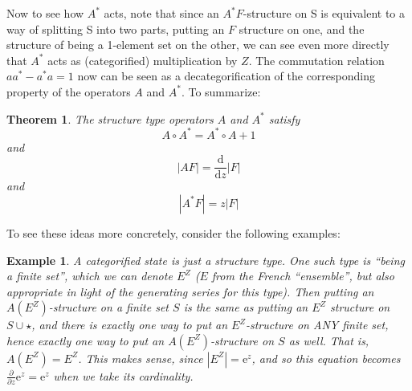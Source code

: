 \documentclass{amsart} \usepackage{amsmath,amssymb,bbm}
\newtheorem{theorem}{Theorem}
\newtheorem{varexample}{Example}
\newenvironment{example}{\begin{varexample}\em}{\em\end{varexample}}
\newcommand{\mathd}{\mathrm{d}}
\newcommand{\mathe}{\mathrm{e}}
\begin{document}
Now to see how $A^{\ast}$ acts, note that since an $A^{\ast}
F$-structure on S is equivalent to a way of splitting S into two
parts, putting an $F$ structure on one, and the structure of being a
1-element set on the other, we can see even more directly that
$A^{\ast}$ acts as (categorified) multiplication by $Z$.  The
commutation relation $a a^{\ast} -a^{\ast} a = 1$ now can be seen as a
decategorification of the corresponding property of the operators $A$
and $A^{\ast}$.  To summarize:

\begin{theorem}
  The structure type operators $A$ and $A^{\ast}$ satisfy
  \begin{equation}
   A \circ A^{\ast} = A^{\ast} \circ A + 1
  \end{equation}
and
  \begin{equation}
   |A F| = \frac{\mathd}{\mathd z} |F|
  \end{equation}
and
  \begin{equation}
   |A^{\ast} F| = z|F|
  \end{equation}
\end{theorem}

To see these ideas more concretely, consider the following examples:

\begin{example}
  A categorified state is just a structure type.  One such type is
  ``being a finite set'', which we can denote $E^Z$ ($E$ from the
  French ``ensemble'', but also appropriate in light of the generating
  series for this type).  Then putting an $A ( E^Z )$-structure on a
  finite set $S$ is the same as putting an $E^Z$ structure on $S \cup
  \star$, and there is exactly one way to put an $E^Z$-structure on
  ANY finite set, hence exactly one way to put an $A ( E^Z
  )$-structure on $S$ as well.  That is, $A ( E^Z ) = E^Z$.  This
  makes sense, since $|E^Z | = \mathe^z$, and so this equation becomes
  $\frac{\partial}{\partial z} \mathe^z = \mathe^z$ when we take its
  cardinality.
\end{example}
\end{document}
